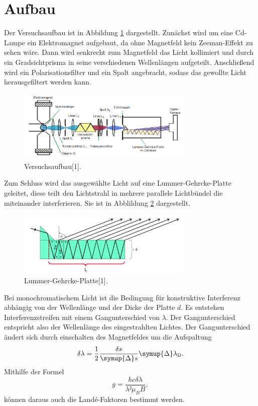 \section{Aufbau}

Der Versuchsaufbau ist in Abbildung \ref{fig:aufb} dargestellt. Zunächst wird um eine Cd-Lampe ein 
Elektromagnet aufgebaut, da ohne Magnetfeld kein Zeeman-Effekt zu sehen wäre.
Dann wird senkrecht zum Magnetfeld das Licht kollimiert und durch ein Gradsichtprisma in seine verschiedenen 
Wellenlängen aufgeteilt. Anschließend wird ein Polarisationsfilter und ein Spalt angebracht, sodass das 
gewollte Licht herausgefiltert werden kann. 

\begin{figure}
  \centering
  \includegraphics[width=0.75\textwidth]{aufbau.png}
  \caption{Versuchsaufbau[1].}
  \label{fig:aufb}
\end{figure}
\FloatBarrier

Zum Schluss wird das ausgewählte Licht auf eine Lummer-Gehrcke-Platte geleitet, diese teilt den Lichtstrahl 
in mehrere parallele Lichtbündel die miteinander interferieren. 
Sie ist in Abblildung \ref{fig:pl} dargestellt. 

\begin{figure}
  \centering
  \includegraphics[width=0.75\textwidth]{platte.png}
  \caption{Lummer-Gehrcke-Platte[1].}
  \label{fig:pl}
\end{figure}
\FloatBarrier

Bei monochromatischem Licht ist die Bedingung für konstruktive Interferenz abhängig von der Wellenlänge und 
der Dicke der Platte $d$. Es entstehen Interferenzstreifen mit einem Gangunterschied von $\lambda$. 
Der Gangunterschied entspricht also der Wellenlänge des eingestrahlten Lichtes. Der Gangunterschied ändert sich durch  
einschalten des Magnetfeldes um die Aufspaltung 
\begin{equation}
  \delta \lambda = \frac{1}{2} \frac{\delta s}{\symup{\Delta}s} \symup{\Delta}\lambda_{\si{D}}.
  \label{dl}
\end{equation}
Mithilfe der Formel 
\begin{equation}
  g = \frac{h c \delta \lambda}{\lambda² \mu_B B},
  \label{eqn:g}
\end{equation}
können daraus auch die Landé-Faktoren bestimmt werden.

